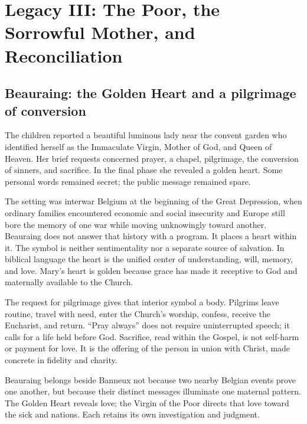 \section{Legacy III: The Poor, the Sorrowful Mother, and Reconciliation}

\subsection{Beauraing: the Golden Heart and a pilgrimage of conversion}


The children reported a beautiful luminous lady near the convent garden who identified herself as the Immaculate Virgin, Mother of God, and Queen of Heaven. Her brief requests concerned prayer, a chapel, pilgrimage, the conversion of sinners, and sacrifice. In the final phase she revealed a golden heart. Some personal words remained secret; the public message remained spare.

The setting was interwar Belgium at the beginning of the Great Depression, when ordinary families encountered economic and social insecurity and Europe still bore the memory of one war while moving unknowingly toward another. Beauraing does not answer that history with a program. It places a heart within it. The symbol is neither sentimentality nor a separate source of salvation. In biblical language the heart is the unified center of understanding, will, memory, and love. Mary's heart is golden because grace has made it receptive to God and maternally available to the Church.

The request for pilgrimage gives that interior symbol a body. Pilgrims leave routine, travel with need, enter the Church's worship, confess, receive the Eucharist, and return. ``Pray always'' does not require uninterrupted speech; it calls for a life held before God. Sacrifice, read within the Gospel, is not self-harm or payment for love. It is the offering of the person in union with Christ, made concrete in fidelity and charity.

Beauraing belongs beside Banneux not because two nearby Belgian events prove one another, but because their distinct messages illuminate one maternal pattern. The Golden Heart reveals love; the Virgin of the Poor directs that love toward the sick and nations. Each retains its own investigation and judgment.

